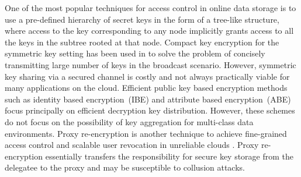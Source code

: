 % 
% 
% 
% 
One of the most popular techniques for access control in online data storage is to use a pre-defined hierarchy of secret keys \cite{ateniese2012provably,boneh2005hierarchical,boyen2006anonymous} in the form of a tree-like structure, where access to the key corresponding to any node implicitly grants access to all the keys in the subtree rooted at that node. Compact key encryption for the symmetric key setting has been used in \cite{benaloh2009patient} to solve the problem of concisely transmitting  large number of keys in the broadcast scenario. However, symmetric key sharing via a secured channel is costly and not always practically viable for many applications on the cloud. Efficient public key based encryption methods such as identity based encryption~(IBE) \cite{boneh2003identity} and attribute based encryption~(ABE) \cite{goyal2006attribute} focus principally on efficient decryption key distribution. However, these schemes do not focus on the possibility of key aggregation for multi-class data environments. Proxy re-encryption is another technique to achieve fine-grained access control and scalable user revocation in unreliable clouds \cite{ateniese2006improved}. Proxy re-encryption essentially transfers the responsibility for secure key storage from the delegatee to the proxy and may be susceptible to collusion attacks. 
